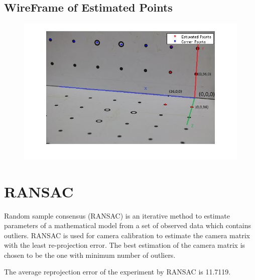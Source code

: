 \documentclass[12pt]{article}
\begin{document}
\subsection{WireFrame of Estimated Points}
\begin{figure}[htp]
\centering
\includegraphics[width=1\textwidth]{wireFrameDLT2.jpg}\hfill
\end{figure}
 
\section{RANSAC}
Random sample consensus (RANSAC) is an iterative method to estimate parameters of a mathematical model from a set of observed data which contains outliers. RANSAC is used for camera calibration to estimate the camera matrix with the least re-projection error.
The best estimation of the camera matrix is chosen to be the one with minimum number of outliers.

The average reprojection error of the experiment by RANSAC is 11.7119.
\end{document}
